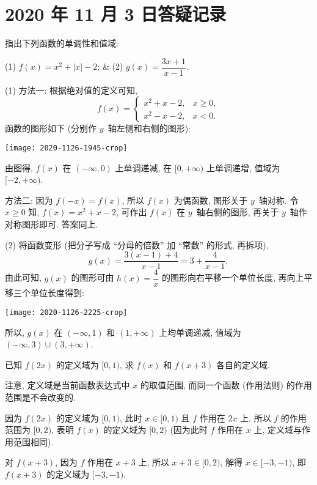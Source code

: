 \section{2020 年 11 月 3 日答疑记录}

\begin{example}
    指出下列函数的单调性和值域:
    \begin{twocolpro}
    (1) $f(x)=x^2+|x|-2$; & (2) $g(x)= \dfrac{3x+1}{x-1}$.
    \end{twocolpro}
\end{example}
\begin{solution}
    (1) 方法一: 根据绝对值的定义可知,
    \[f(x)=\begin{cases}
        x^2+x-2,& x\geqslant 0,\\
        x^2-x-2,& x< 0.
        \end{cases}\]
    函数的图形如下 (分别作 $y$~轴左侧和右侧的图形):
    
    \begin{center}
        \texttt{[image: 2020-1126-1945-crop]}
    \end{center}
    
    由图得, $f(x)$ 在 $(-\infty,0)$ 上单调递减, 在 $[0,+\infty)$ 上单调递增, 值域为 $[-2,+\infty)$.
    
    方法二: 因为 $f(-x)=f(x)$, 所以 $f(x)$ 为偶函数, 图形关于 $y$~轴对称. 令 $x\geqslant 0$ 知, $f(x)=x^2+x-2$, 可作出 $f(x)$ 在 $y$~轴右侧的图形, 再关于 $y$~轴作对称图形即可. 答案同上. 
    
    (2) 将函数变形 (把分子写成 ``分母的倍数'' 加 ``常数'' 的形式, 再拆项),
    \[g(x)= \frac{3(x-1)+4}{x-1}= 3+\frac4{x-1},\]
    由此可知, $g(x)$ 的图形可由 $h(x)=\dfrac4x$ 的图形向右平移一个单位长度, 再向上平移三个单位长度得到:
    
    \begin{center}
        \texttt{[image: 2020-1126-2225-crop]}
    \end{center}
    
    所以, $g(x)$ 在 $(-\infty,1)$ 和 $(1,+\infty)$ 上均单调递减, 值域为 $(-\infty,3)\cup (3,+\infty)$.
\end{solution}

\begin{example}
    已知 $f(2x)$ 的定义域为 $[0,1)$, 求 $f(x)$ 和 $f(x+3)$ 各自的定义域.
\end{example}
\begin{solution}
    注意, 定义域是当前函数表达式中 $x$ 的取值范围, 而同一个函数 (作用法则) 的作用范围是不会改变的.
    
    因为 $f(2x)$ 的定义域为 $[0,1)$, 此时 $x\in[0,1)$ 且 $f$ 作用在 $2x$ 上, 所以 $f$ 的作用范围为 $[0,2)$, 表明 $f(x)$ 的定义域为 $[0,2)$ (因为此时 $f$ 作用在 $x$ 上, 定义域与作用范围相同).
    
    对 $f(x+3)$, 因为 $f$ 作用在 $x+3$ 上, 所以 $x+3\in[0,2)$, 解得 $x\in[-3,-1)$, 即 $f(x+3)$ 的定义域为 $[-3,-1)$.
\end{solution}

